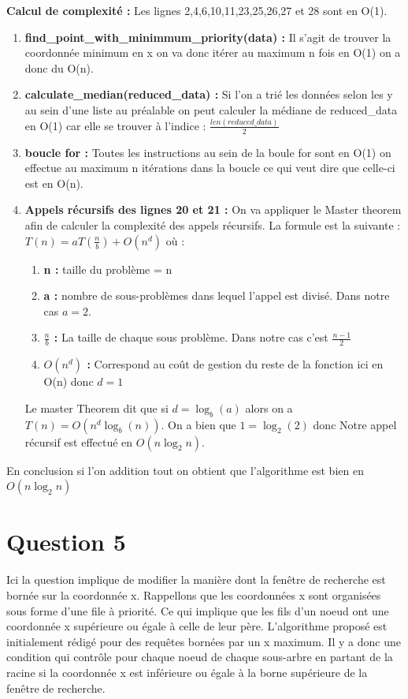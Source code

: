 \documentclass{article}
\begin{document}
    \textbf{Calcul de complexité : }
    Les lignes 2,4,6,10,11,23,25,26,27 et 28 sont en O(1). \\
    \begin{enumerate}
        \item\textbf{find\_point\_with\_minimmum\_priority(data) : } Il s'agit de trouver la coordonnée minimum en x on va donc itérer au maximum
        n fois en O(1) on a donc du O(n).
        \item\textbf{calculate\_median(reduced\_data) : } Si l'on a trié les données selon les y au sein d'une liste au préalable on peut calculer la 
        médiane de reduced\_data en O(1) car elle se trouver à l'indice : $\frac{len(reduced\_data)}{2}$
        \item\textbf{boucle for : } Toutes les instructions au sein de la boule for sont en O(1) on effectue au maximum n itérations dans la boucle
        ce qui veut dire que celle-ci est en O(n).
        \item\textbf{Appels récursifs des lignes 20 et 21 :} On va appliquer le Master theorem afin de calculer la complexité des appels récursifs.
        La formule est la suivante : $T(n) = aT(\frac{n}{b}) + O(n^d)$ où : 
            \begin{enumerate}
                \item \textbf{n : } taille du problème = n
                \item \textbf{a : } nombre de sous-problèmes dans lequel l'appel est divisé. Dans notre cas $a = 2$.
                \item \textbf{$\frac{n}{b}$ : } La taille de chaque sous problème. Dans notre cas c'est $\frac{n-1}{2}$
                \item \textbf{$O(n^d)$ : } Correspond au coût de gestion du reste de la fonction ici en O(n) donc $d=1$
            \end{enumerate}
        Le master Theorem dit que si $d = \log_b(a)$ alors on a $T(n) = O(n^d \log_b(n))$. On a bien que $1 = \log_2(2)$ donc
        Notre appel récursif est effectué en $O(n\log_2n)$.

    \end{enumerate}

    En conclusion si l'on addition tout on obtient que l'algorithme est bien en $O(n\log_2n)$

\newpage

\section{Question 5}
Ici la question implique de modifier la manière dont la fenêtre de recherche est bornée sur la coordonnée x. Rappellons que les coordonnées x sont organisées sous forme d'une file à priorité.
Ce qui implique que les fils d'un noeud ont une coordonnée x supérieure ou égale à celle de leur père. L'algorithme proposé est initialement rédigé pour des requêtes bornées par un x maximum. Il y a donc
une condition qui contrôle pour chaque noeud de chaque sous-arbre en partant de la racine si la coordonnée x est inférieure ou égale à la borne supérieure de la fenêtre de recherche. \\
\end{document}
